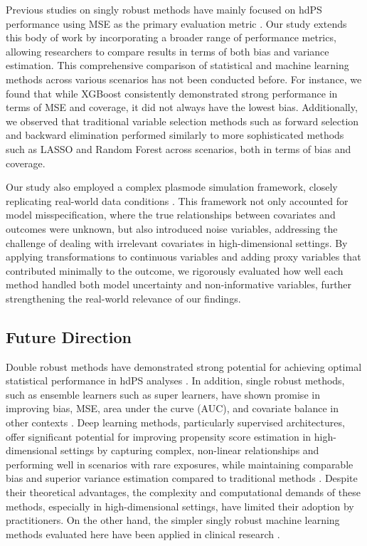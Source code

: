 \documentclass[sn-vancouver,Numbered,lineno,pdflatex]{sn-jnl}
\begin{document}
Previous studies on singly robust methods have mainly focused on hdPS
performance using MSE as the primary evaluation metric
\citep{franklin2015regularized, pang2016effect, wyss2018using, karim2018can, simon2023evaluating}.
Our study extends this body of work by incorporating a broader range of
performance metrics, allowing researchers to compare results in terms of
both bias and variance estimation. This comprehensive comparison of
statistical and machine learning methods across various scenarios has
not been conducted before. For instance, we found that while XGBoost
consistently demonstrated strong performance in terms of MSE and
coverage, it did not always have the lowest bias. Additionally, we
observed that traditional variable selection methods such as forward
selection and backward elimination performed similarly to more
sophisticated methods such as LASSO and Random Forest across scenarios,
both in terms of bias and coverage.

Our study also employed a complex plasmode simulation framework, closely
replicating real-world data conditions \citep{franklin2014plasmode}.
This framework not only accounted for model misspecification, where the
true relationships between covariates and outcomes were unknown, but
also introduced noise variables, addressing the challenge of dealing
with irrelevant covariates in high-dimensional settings. By applying
transformations to continuous variables and adding proxy variables that
contributed minimally to the outcome, we rigorously evaluated how well
each method handled both model uncertainty and non-informative
variables, further strengthening the real-world relevance of our
findings.

\subsection{Future Direction}\label{future-direction}

Double robust methods have demonstrated strong potential for achieving
optimal statistical performance in hdPS analyses
\citep{pang2016targeted, pang2016effect, benasseur2022comparison}. In
addition, single robust methods, such as ensemble learners such as super
learners, have shown promise in improving bias, MSE, area under the
curve (AUC), and covariate balance in other contexts
\citep{guertin2016head, wyss2018using, ju2019propensity}. Deep learning
methods, particularly supervised architectures, offer significant
potential for improving propensity score estimation in high-dimensional
settings by capturing complex, non-linear relationships and performing
well in scenarios with rare exposures, while maintaining comparable bias
and superior variance estimation compared to traditional methods
\citep{karim2024can}. Despite their theoretical advantages, the
complexity and computational demands of these methods, especially in
high-dimensional settings, have limited their adoption by practitioners.
On the other hand, the simpler singly robust machine learning methods
evaluated here have been applied in clinical research
\citep{hossain2023role, basham2021post}.
\end{document}
